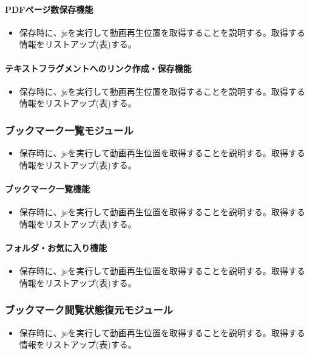 \paragraph{PDFページ数保存機能}
\begin{itemize}
  \item 保存時に、jsを実行して動画再生位置を取得することを説明する。取得する情報をリストアップ(表)する。
\end{itemize}

\paragraph{テキストフラグメントへのリンク作成・保存機能}
\begin{itemize}
  \item 保存時に、jsを実行して動画再生位置を取得することを説明する。取得する情報をリストアップ(表)する。
\end{itemize}

\subsubsection{ブックマーク一覧モジュール}
\begin{itemize}
  \item 保存時に、jsを実行して動画再生位置を取得することを説明する。取得する情報をリストアップ(表)する。
\end{itemize}

\paragraph{ブックマーク一覧機能}
\begin{itemize}
  \item 保存時に、jsを実行して動画再生位置を取得することを説明する。取得する情報をリストアップ(表)する。
\end{itemize}

\paragraph{フォルダ・お気に入り機能}
\begin{itemize}
  \item 保存時に、jsを実行して動画再生位置を取得することを説明する。取得する情報をリストアップ(表)する。
\end{itemize}

\subsubsection{ブックマーク閲覧状態復元モジュール}
\begin{itemize}
  \item 保存時に、jsを実行して動画再生位置を取得することを説明する。取得する情報をリストアップ(表)する。
\end{itemize}

